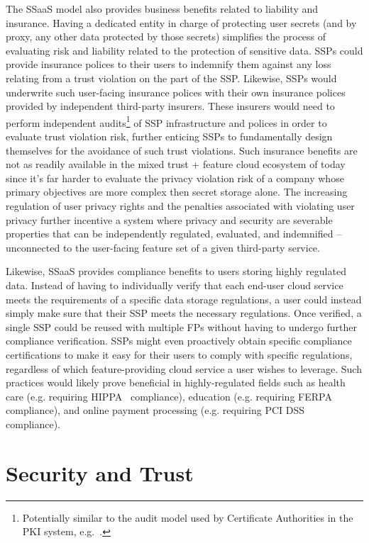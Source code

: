 The SSaaS model also provides business benefits related to liability
and insurance. Having a dedicated entity in charge of protecting user
secrets (and by proxy, any other data protected by those secrets)
simplifies the process of evaluating risk and liability related to the
protection of sensitive data. SSPs could provide insurance polices to
their users to indemnify them against any loss relating from a trust
violation on the part of the SSP. Likewise, SSPs would underwrite such
user-facing insurance polices with their own insurance polices
provided by independent third-party insurers. These insurers would
need to perform independent audits\footnote{Potentially similar to the
  audit model used by Certificate Authorities in the PKI system,
  e.g.~\cite{hall-caaudit, mozilla-capolicy}.} of SSP infrastructure
and polices in order to evaluate trust violation risk, further
enticing SSPs to fundamentally design themselves for the avoidance of
such trust violations. Such insurance benefits are not as readily
available in the mixed trust + feature cloud ecosystem of today since
it's far harder to evaluate the privacy violation risk of a company
whose primary objectives are more complex then secret storage
alone. The increasing regulation of user privacy rights and the
penalties associated with violating user privacy further incentive a
system where privacy and security are severable properties that can be
independently regulated, evaluated, and indemnified -- unconnected to
the user-facing feature set of a given third-party service.

Likewise, SSaaS provides compliance benefits to users storing highly
regulated data. Instead of having to individually verify that each
end-user cloud service meets the requirements of a specific data
storage regulations, a user could instead simply make sure that their
SSP meets the necessary regulations. Once verified, a single SSP could
be reused with multiple FPs without having to undergo further
compliance verification. SSPs might even proactively obtain specific
compliance certifications to make it easy for their users to comply
with specific regulations, regardless of which feature-providing cloud
service a user wishes to leverage. Such practices would likely prove
beneficial in highly-regulated fields such as health care
(e.g. requiring HIPPA~\cite{hippa} compliance), education
(e.g. requiring FERPA~\cite{ferpa} compliance), and online payment
processing (e.g. requiring PCI DSS~\cite{pcidss} compliance).

\section{Security and Trust}
\label{chap:ssaas:trust}

